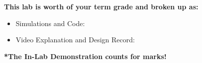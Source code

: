\vspace{0.5cm}

\textbf{
This lab is worth \labThreeIsWorth{} of your term grade and broken up as:
}
\begin{itemize}
    \item Simulations and Code: \labThreeSimsWorth{}
    \item Video Explanation and Design Record: \labThreeVideoWorth{}
\end{itemize}
\textbf{*The In-Lab Demonstration counts for marks!}